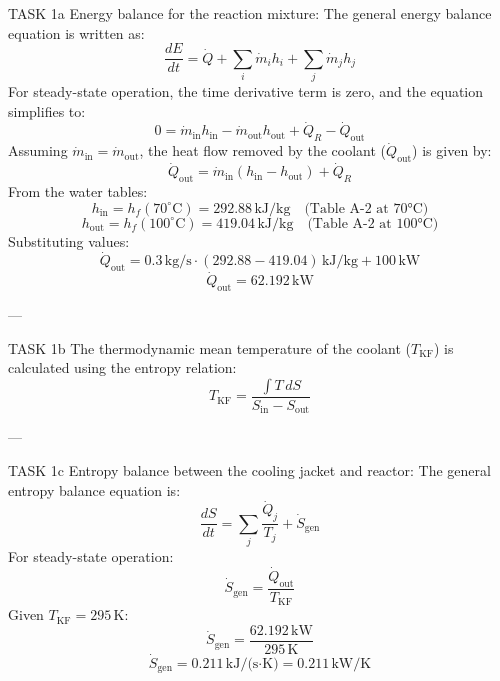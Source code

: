 TASK 1a  
Energy balance for the reaction mixture:  
The general energy balance equation is written as:  
\[
\frac{dE}{dt} = \dot{Q} + \sum_i \dot{m}_i h_i + \sum_j \dot{m}_j h_j
\]  
For steady-state operation, the time derivative term is zero, and the equation simplifies to:  
\[
0 = \dot{m}_{\text{in}} h_{\text{in}} - \dot{m}_{\text{out}} h_{\text{out}} + \dot{Q}_R - \dot{Q}_{\text{out}}
\]  
Assuming \( \dot{m}_{\text{in}} = \dot{m}_{\text{out}} \), the heat flow removed by the coolant (\( \dot{Q}_{\text{out}} \)) is given by:  
\[
\dot{Q}_{\text{out}} = \dot{m}_{\text{in}} (h_{\text{in}} - h_{\text{out}}) + \dot{Q}_R
\]  
From the water tables:  
\[
h_{\text{in}} = h_f(70^\circ\text{C}) = 292.88 \, \text{kJ/kg} \quad \text{(Table A-2 at 70°C)}
\]  
\[
h_{\text{out}} = h_f(100^\circ\text{C}) = 419.04 \, \text{kJ/kg} \quad \text{(Table A-2 at 100°C)}
\]  
Substituting values:  
\[
\dot{Q}_{\text{out}} = 0.3 \, \text{kg/s} \cdot (292.88 - 419.04) \, \text{kJ/kg} + 100 \, \text{kW}
\]  
\[
\dot{Q}_{\text{out}} = 62.192 \, \text{kW}
\]  

---

TASK 1b  
The thermodynamic mean temperature of the coolant (\( T_{\text{KF}} \)) is calculated using the entropy relation:  
\[
T_{\text{KF}} = \frac{\int T \, dS}{S_{\text{in}} - S_{\text{out}}}
\]  

---

TASK 1c  
Entropy balance between the cooling jacket and reactor:  
The general entropy balance equation is:  
\[
\frac{dS}{dt} = \sum_j \frac{\dot{Q}_j}{T_j} + \dot{S}_{\text{gen}}
\]  
For steady-state operation:  
\[
\dot{S}_{\text{gen}} = \frac{\dot{Q}_{\text{out}}}{T_{\text{KF}}}
\]  
Given \( T_{\text{KF}} = 295 \, \text{K} \):  
\[
\dot{S}_{\text{gen}} = \frac{62.192 \, \text{kW}}{295 \, \text{K}}
\]  
\[
\dot{S}_{\text{gen}} = 0.211 \, \text{kJ/(s·K)} = 0.211 \, \text{kW/K}
\]